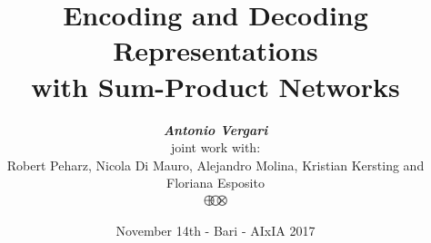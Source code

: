 \documentclass[xcolor={usenames,dvipsnames,svgnames}, compress]{beamer}
\begin{document}
\newlength{\custombulletheight}
\setlength{\custombulletheight}{\dimexpr0.5\ht1-0.5\ht2}

\title{{\color{lacamlilac}Encoding and Decoding\\Representations\\with
    Sum-Product Networks}}
\author{\vspace{-10pt}\emph{\textbf{Antonio
      Vergari}}\\\vspace{10pt}joint  work with:\\ Robert
  Peharz, Nicola Di Mauro, Alejandro Molina, Kristian Kersting and Floriana Esposito\\\vspace{10pt}\includegraphics[width=20pt]{figures/logo1}}
\date{November 14th - Bari - AIxIA 2017}
\end{document}
